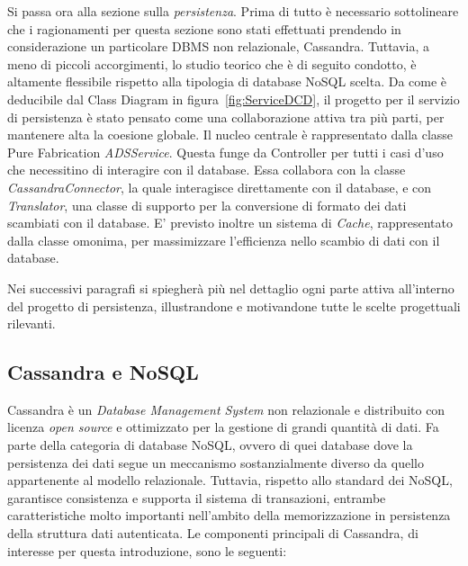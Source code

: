 	Si passa ora alla sezione sulla \textit{persistenza}. Prima di tutto è necessario sottolineare che i ragionamenti per questa sezione sono stati effettuati prendendo in considerazione un particolare DBMS non relazionale, Cassandra. Tuttavia, a meno di piccoli accorgimenti, lo studio teorico che è di seguito condotto, è altamente flessibile rispetto alla tipologia di database NoSQL scelta.
	Da come è deducibile dal Class Diagram in figura~\ref{fig:ServiceDCD}, il progetto per il servizio di persistenza è stato pensato come una collaborazione attiva tra più parti, per mantenere alta la coesione globale.
	Il nucleo centrale è rappresentato dalla classe Pure Fabrication \textit{ADSService}. Questa funge da Controller per tutti i casi d'uso che necessitino di interagire con il database. Essa collabora con la classe \textit{CassandraConnector}, la quale interagisce direttamente con il database, e con \textit{Translator}, una classe di supporto per la conversione di formato dei dati scambiati con il database. E' previsto inoltre un sistema di \textit{Cache}, rappresentato dalla classe omonima, per massimizzare l'efficienza nello scambio di dati con il database.

	Nei successivi paragrafi si spiegherà più nel dettaglio ogni parte attiva all'interno del progetto di persistenza, illustrandone e motivandone tutte le scelte progettuali rilevanti.

	\subsection{Cassandra e NoSQL}
	

		Cassandra è un \textit{Database Management System} non relazionale e distribuito con licenza \textit{open source} e ottimizzato per la gestione di grandi quantità di dati. Fa parte della categoria di database NoSQL, ovvero di quei database dove la persistenza dei dati segue un meccanismo sostanzialmente diverso da quello appartenente al modello relazionale.  Tuttavia, rispetto allo standard dei NoSQL, garantisce consistenza e supporta il sistema di transazioni, entrambe caratteristiche molto importanti nell'ambito della memorizzazione in persistenza della struttura dati autenticata. Le componenti principali di Cassandra, di interesse per questa introduzione, sono le seguenti:
		

